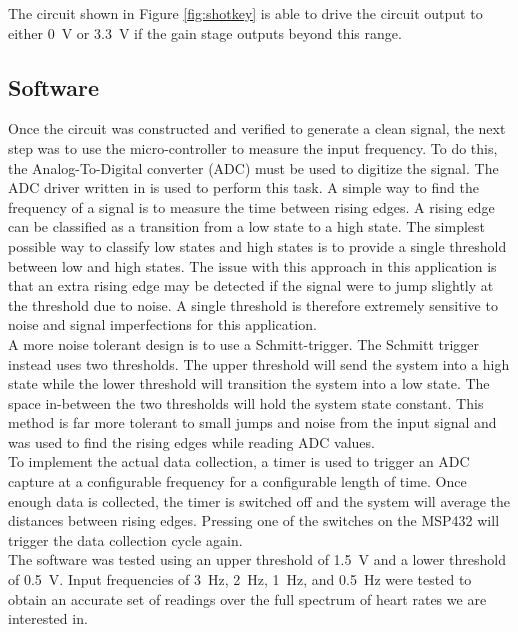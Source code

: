 \documentclass[CMPE]{../KGCOEReport}
\begin{document}
	The circuit shown in Figure \ref{fig:shotkey} is able to drive the circuit
	output to either \SI{0}{\volt} or \SI{3.3}{\volt} if the gain stage outputs
	beyond this range.

	\subsection*{Software}

	Once the circuit was constructed and verified to generate a clean signal, the
	next step was to use the micro-controller to measure the input frequency. To do
	this, the Analog-To-Digital converter (ADC) must be used to digitize the signal.
	The ADC driver written in \cite{b3} is used to perform this task. A simple way
	to find the frequency of a signal is to measure the time between rising edges.
	A rising edge can be classified as a transition from a low state to a high state.
	The simplest possible way to classify low states and high states is to provide a
	single threshold between low and high states. The issue with this approach in this
	application is that an extra rising edge may be detected if the signal were to
	jump slightly at the threshold due to noise. A single threshold is therefore extremely
	sensitive to noise and signal imperfections for this application.\\

	A more noise tolerant design is to use a Schmitt-trigger. The Schmitt trigger instead
	uses two thresholds. The upper threshold will send the system into a high state while
	the lower threshold will transition the system into a low state. The space in-between
	the two thresholds will hold the system state constant. This method is far more
	tolerant to small jumps and noise from the input signal and was used to find the
	rising edges while reading ADC values.\\

	To implement the actual data collection, a timer is used to trigger an ADC capture
	at a configurable frequency for a configurable length of time. Once enough data
	is collected, the timer is switched off and the system will average the distances
	between rising edges. Pressing one of the switches on the MSP432 will trigger
	the data collection cycle again.\\

	The software was tested using an upper threshold of \SI{1.5}{\volt} and a lower
	threshold of \SI{0.5}{\volt}. Input frequencies of \SI{3}{\hertz}, \SI{2}{\hertz},
	\SI{1}{\hertz}, and \SI{0.5}{\hertz} were tested to obtain an accurate set of readings
	over the full spectrum of heart rates we are interested in.
\end{document}
